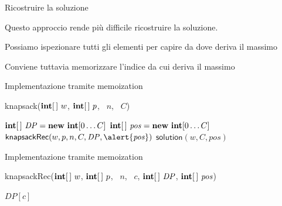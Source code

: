 \begin{frame}{Ricostruire la soluzione}

\vspace{-9pt}
Questo approccio rende più difficile ricostruire la soluzione. 
\BIL
\item Possiamo ispezionare tutti gli elementi per capire da dove 
deriva il massimo
\item Conviene tuttavia memorizzare l'indice da cui deriva il massimo
\EIL

\end{frame}

\begin{frame}{Implementazione tramite memoization}

\vspace{-9pt}
\begin{Procedure}
\caption[A]{\textsf{knapsack}($\INTEGER[\,]\ w$, $\INTEGER[\,]\ p$, \INTEGER\ $n$, \INTEGER\ $C$)}
  $\INTEGER[\,]\ \mathit{DP} = \NEW\ \INTEGER[0 \ldots C]$\;
  \alert{$\INTEGER[\,]\ \mathit{pos} = \NEW\ \INTEGER[0 \ldots C]$}\;
  $\textsf{knapsackRec}(w, p, n, C, \mathit{DP}, \alert{\mathit{pos}})$\;
  \Return \alert{$\textsf{solution}(w,C, \mathit{pos})$}\;
\end{Procedure}
\end{frame}



\begin{frame}{Implementazione tramite memoization}

\vspace{-9pt}
\begin{Procedure}
\caption[A]{\textsf{knapsackRec}($\INTEGER[\,]\ w$, $\INTEGER[\,]\ p$, \INTEGER\ $n$, \INTEGER\ $c$, $\INTEGER[\,]\ \mathit{DP}$, \alert{$\INTEGER[\,]\ \mathit{\mathit{pos}}$})}
\Return $\mathit{DP}[c]$\;
\end{Procedure}
\end{frame}

